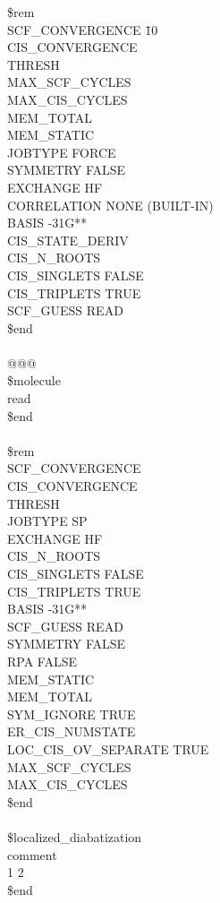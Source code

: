 \begin{tabbing}
\$rem\\
SCF\_CONVERGENCE \quad\qquad\= 10\\
CIS\_CONVERGENCE\\
THRESH\\
MAX\_SCF\_CYCLES\\
MAX\_CIS\_CYCLES\\
MEM\_TOTAL \\
MEM\_STATIC  \\
JOBTYPE   \>   FORCE\\
SYMMETRY  \>   FALSE\\
EXCHANGE     \>     HF\\
CORRELATION   \>    NONE  (BUILT-IN)\\
BASIS     -31G**\\
CIS\_STATE\_DERIV   \\
CIS\_N\_ROOTS    \\
CIS\_SINGLETS    \>    FALSE\\
CIS\_TRIPLETS    \>    TRUE\\
SCF\_GUESS \>  READ\\
\$end\\
\\
@@@\\
\$molecule\\
read\\
\$end\\
\\
\$rem\\
SCF\_CONVERGENCE\\
CIS\_CONVERGENCE\\
THRESH\\
JOBTYPE   \>    SP\\
EXCHANGE \>  HF\\
CIS\_N\_ROOTS   \\
CIS\_SINGLETS \>  FALSE\\
CIS\_TRIPLETS   \>   TRUE\\
BASIS      -31G**\\
SCF\_GUESS \>  READ\\
SYMMETRY    \>      FALSE\\
RPA        \>       FALSE\\
MEM\_STATIC  \\
MEM\_TOTAL  \\
SYM\_IGNORE \>  TRUE\\
ER\_CIS\_NUMSTATE  \\
LOC\_CIS\_OV\_SEPARATE \>  TRUE\\
MAX\_SCF\_CYCLES  \\
MAX\_CIS\_CYCLES \\
\$end\\
\\
\$localized\_diabatization\\
comment\\
1 2\\
\$end\\
 \end{tabbing}
